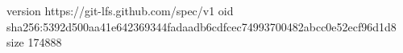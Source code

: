 version https://git-lfs.github.com/spec/v1
oid sha256:5392d500aa41e642369344fadaadb6cdfcec74993700482abcc0e52ecf96d1d8
size 174888
